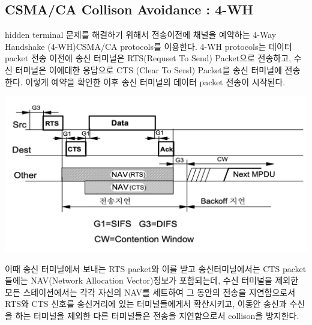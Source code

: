 \begin{multicols}{2}
\section{CSMA/CA Collison Avoidance : 4-WH}
\vspace{-4mm}
hidden terminal 문제를 해결하기 위해서 전송이전에 채널을 예약하는 4-Way Handshake (4-WH)CSMA/CA protocols를 이용한다.
4-WH protocols는 데이터 packet 전송 이전에 송신 터미널은 RTS(Requset To Send) Packet으로 전송하고, 수신 터미널은 이에대한 응답으로 CTS (Clear To Send) Packet을 송신 터미널에 전송한다. 이렇게 예약을 확인한 이후 송신 터미널의 데이터 packet 전송이 시작된다.\\
    \begin{minipage}{\columnwidth}
    \vspace{2mm}
    \centering%
    \includegraphics[width=.96\textwidth]{image/week12/4-1.png}
    \vspace{-4mm}
    \end{minipage}
    
이때 송신 터미널에서 보내는 RTS packet와 이를 받고 송신터미널에서는 CTS packet들에는 NAV(Network Allocation Vector)정보가 포함되는데, 수신 터미널을 제외한 모든 스테이션에서는 각각 자신의 NAV를 세트하여 그 동안의 전송을 지연함으로서 RTS와 CTS 신호를 송신거리에 있는 터미널들에게서 확산시키고, 이동안 송신과 수신을 하는 터미널을 제외한 다른 터미널들은 전송을 지연함으로서 collison을 방지한다.
\end{multicols}